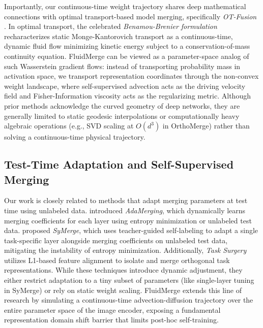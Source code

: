 Importantly, our continuous-time weight trajectory shares deep mathematical connections with optimal transport-based model merging, specifically \emph{OT-Fusion} \cite{singh2020model}. In optimal transport, the celebrated \emph{Benamou-Brenier formulation} \cite{benamou2000formula} recharacterizes static Monge-Kantorovich transport as a continuous-time, dynamic fluid flow minimizing kinetic energy subject to a conservation-of-mass continuity equation. FluidMerge can be viewed as a parameter-space analog of such Wasserstein gradient flows: instead of transporting probability mass in activation space, we transport representation coordinates through the non-convex weight landscape, where self-supervised advection acts as the driving velocity field and Fisher-Information viscosity acts as the regularizing metric. Although prior methods acknowledge the curved geometry of deep networks, they are generally limited to static geodesic interpolations or computationally heavy algebraic operations (e.g., SVD scaling at $O(d^3)$ in OrthoMerge) rather than solving a continuous-time physical trajectory.

\subsection{Test-Time Adaptation and Self-Supervised Merging}
Our work is closely related to methods that adapt merging parameters at test time using unlabeled data. \citet{yang2024adamerging} introduced \emph{AdaMerging}, which dynamically learns merging coefficients for each layer using entropy minimization or unlabeled test data. \citet{jung2025symerge} proposed \emph{SyMerge}, which uses teacher-guided self-labeling to adapt a single task-specific layer alongside merging coefficients on unlabeled test data, mitigating the instability of entropy minimization. Additionally, \emph{Task Surgery} \cite{zhang2024task} utilizes L1-based feature alignment to isolate and merge orthogonal task representations. While these techniques introduce dynamic adjustment, they either restrict adaptation to a tiny subset of parameters (like single-layer tuning in SyMerge) or rely on static weight scaling. FluidMerge extends this line of research by simulating a continuous-time advection-diffusion trajectory over the entire parameter space of the image encoder, exposing a fundamental representation domain shift barrier that limits post-hoc self-training.

